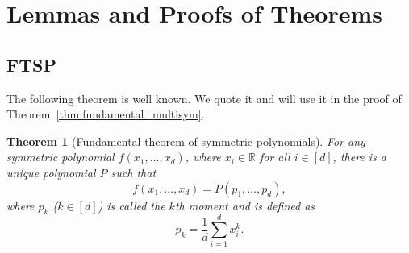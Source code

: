 \documentclass{article}
\theoremstyle{plain}
\newtheorem{theorem}{Theorem}
\begin{document}

\clearpage

\section{Lemmas and Proofs of Theorems}

\subsection{FTSP}
The following theorem is well known. We quote it and will use it in the proof of Theorem~\ref{thm:fundamental_multisym}. 
\begin{theorem}[Fundamental theorem of symmetric polynomials]   \label{thm:fund_sym}
    For any symmetric polynomial $f(x_1, \dots, x_d)$, where $x_i\in\mathbb{R}$ for all $i\in[d]$, there is a unique polynomial $P$ such that
    \begin{equation}
        f(x_1, \dots, x_d) = P(p_1, \dots, p_d) ,
    \end{equation}
    where $p_k$ ($k\in [d]$) is called the $k$th moment and is defined as 
    \begin{equation}
        p_k = \frac{1}{d}\sum_{i=1}^d x_i^k  .
    \end{equation}
\end{theorem}
\end{document}
